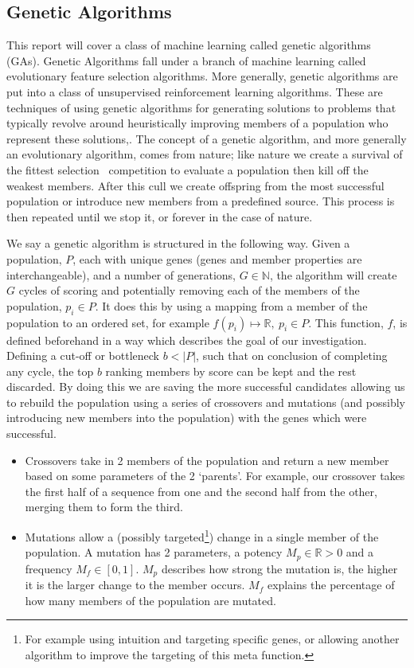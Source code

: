 \subsection{Genetic Algorithms}\label{subsec:geneticAlgorithms}
This report will cover a class of machine learning called genetic algorithms (GAs).
Genetic Algorithms fall under a branch of machine learning called evolutionary feature selection algorithms.
More generally, genetic algorithms are put into a class of unsupervised reinforcement learning algorithms.
These are techniques of using genetic algorithms for generating solutions to problems that typically revolve around heuristically improving members of a population who represent these solutions,\cite{horn1994niched,rahmat1999electromagnetic}.
The concept of a genetic algorithm, and more generally an evolutionary algorithm, comes from nature;
like nature we create a survival of the fittest selection~\cite{darwin2009origin} competition to evaluate a population then kill off the weakest members.
After this cull we create offspring from the most successful population or introduce new members from a predefined source.
This process is then repeated until we stop it, or forever in the case of nature.

We say a genetic algorithm is structured in the following way.
Given a population, \(P\), each with unique genes (genes and member properties are interchangeable), and a number of generations, \(G\in \mathbb{N}\), the algorithm will create \(G\) cycles of scoring and potentially removing each of the members of the population, \(p_i \in P\).
It does this by using a mapping from a member of the population to an ordered set, for example \(f(p_i)\mapsto \mathbb{R},\ p_i \in P\).
This function, \(f\), is defined beforehand in a way which describes the goal of our investigation.
Defining a cut-off or bottleneck \(b<|P|\), such that on conclusion of completing any cycle, the top \(b\) ranking members by score can be kept and the rest discarded.
By doing this we are saving the more successful candidates allowing us to rebuild the population using a series of crossovers and mutations (and possibly introducing new members into the population) with the genes which were successful.

\begin{itemize}
    \item Crossovers take in 2 members of the population and return a new member based on some parameters of the 2 `parents'.
    For example, our crossover takes the first half of a sequence from one and the second half from the other, merging them to form the third.
    \item Mutations allow a (possibly targeted\footnote{For example using intuition and targeting specific genes, or allowing another algorithm to improve the targeting of this meta function.}) change in a single member of the population.
    A mutation has 2 parameters, a potency \(M_p\in \mathbb{R}>0\) and a frequency \(M_f\in [0,1]\).
    \(M_p\) describes how strong the mutation is, the higher it is the larger change to the member occurs.
    \(M_f\) explains the percentage of how many members of the population are mutated.
\end{itemize}

